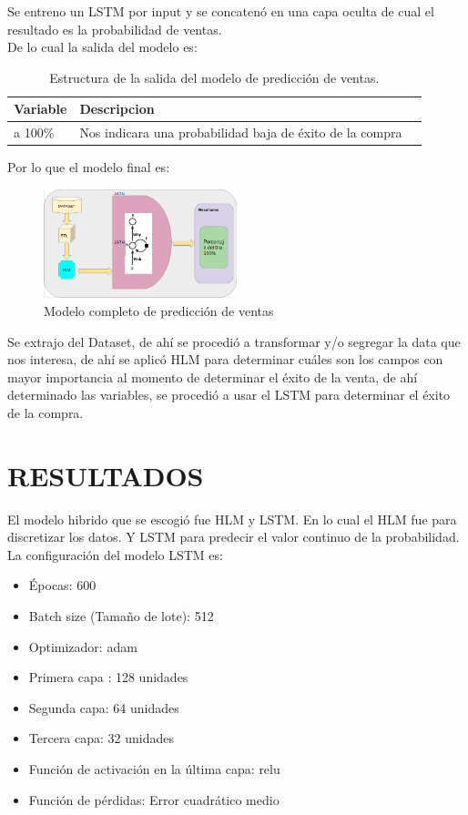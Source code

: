 \documentclass[conference]{IEEEtran}
\begin{document}
Se entreno un LSTM por input y se concatenó en una capa oculta de cual el resultado es la probabilidad de ventas.\\
De lo cual la salida del modelo es:
\begin{table}[h]
    \caption{Estructura de la salida del modelo de predicción de ventas.}
    \centering
    \begin{tabularx}{0.4\textwidth} {
            | >{\raggedright\arraybackslash}X
            | >{\centering\arraybackslash}X
            | >{\raggedleft\arraybackslash}X |}
        \hline
        Variable              & Descripcion                             \\
        \hline
        0 a 100\%        & Nos indicara una probabilidad baja de éxito de la compra        \\
        \hline
    \end{tabularx}
    \label{tab3}
\end{table}

Por lo que el modelo final es: \\
\begin{figure}[H]
    \centering
    \includegraphics[width=0.5\textwidth]{modelo_completo}
    \caption{Modelo completo de predicción de ventas}
    \label{fig:arquitectura}
\end{figure}

Se extrajo del Dataset, de ahí se procedió a transformar y/o segregar la data que nos interesa, de ahí se aplicó HLM para determinar cuáles son los campos con mayor importancia al momento de determinar el éxito de la venta, de ahí determinado las variables, se procedió a usar el LSTM para determinar el éxito de la compra.
\section{RESULTADOS}
El modelo hibrido que se escogió fue HLM y LSTM. En lo cual el HLM fue para discretizar los datos. Y LSTM para predecir el valor continuo de la probabilidad.\\
La configuración del modelo LSTM es:
\begin{itemize}
\item Épocas: 600
\item Batch size (Tamaño de lote): 512
\item Optimizador: adam
\item Primera capa : 128 unidades
\item Segunda capa: 64 unidades
\item Tercera capa: 32 unidades
\item Función de activación en la última capa: relu
\item Función de pérdidas: Error cuadrático medio
\end{itemize}
\end{document}

